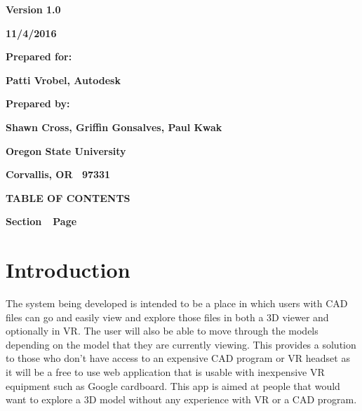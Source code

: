 \documentclass[letterpaper, 10pt, draftclsnofoot, compsoc, onecolumn]{IEEEtran}
\begin{document}
\bigskip
\bigskip
\bigskip

\begin{figure}
\centering
\end{figure}

\bigskip
\bigskip

{\centering{}\bfseries\color{black}
Version 1.0
\par}

{\centering{}\bfseries\color{black}
11/4/2016
\par}


\bigskip
\bigskip

{\centering{}\bfseries\color{black}
Prepared for:
\par}

{\centering{}\bfseries\color{black}
Patti Vrobel, Autodesk
\par}


\bigskip
\bigskip

{\centering{}\bfseries\color{black}
Prepared by:  
\par}

{\centering{}\bfseries\color{black}
Shawn Cross, Griffin Gonsalves, Paul Kwak
\par}

{\centering{}\bfseries\color{black}
Oregon State University
\par}

{\centering{}\bfseries\color{black}
Corvallis, OR \ 97331
\par}


{\centering{}\bfseries\color{black}
TABLE OF CONTENTS
\par}

\bigskip

{\bfseries\color{black}
Section\ \ Page}

\setcounter{tocdepth}{9}
\renewcommand\contentsname{}
\tableofcontents

\bigskip
\clearpage

\section{Introduction}
	The system being developed is intended to be a place in which users with CAD files can go and easily view and explore those files in both a 3D viewer and optionally in VR. The user will also be able to move through the models depending on the model that they are currently viewing. This provides a solution to those who don't have access to an expensive CAD program or VR headset as it will be a free to use web application that is usable with inexpensive VR equipment such as Google cardboard. This app is aimed at people that would want to explore a 3D model without any experience with VR or a CAD program.
 
\end{document}
